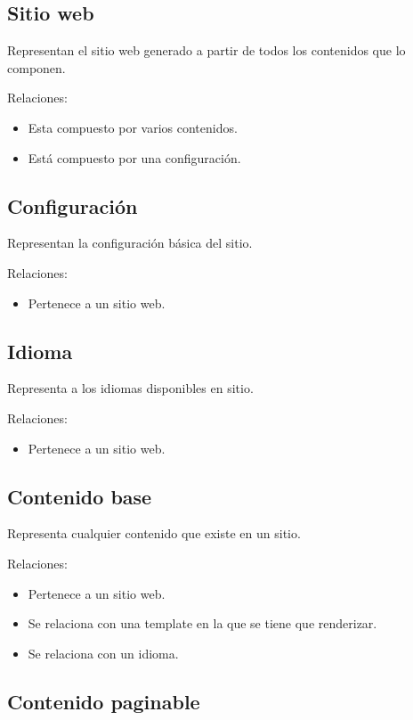 \subsection{Sitio web}

Representan el sitio web generado a partir de todos los contenidos que lo componen.

Relaciones:
\begin{itemize}
    \item Esta compuesto por varios contenidos.
    \item Está compuesto por una configuración.
\end{itemize}

\subsection{Configuración}

Representan la configuración básica del sitio.

Relaciones:
\begin{itemize}
    \item Pertenece a un sitio web.
\end{itemize}

\subsection{Idioma}

Representa a los idiomas disponibles en sitio.

Relaciones:
\begin{itemize}
    \item Pertenece a un sitio web.
\end{itemize}

\subsection{Contenido base}

Representa cualquier contenido que existe en un sitio.

Relaciones:
\begin{itemize}
    \item Pertenece a un sitio web.
    \item Se relaciona con una template en la que se tiene que renderizar.
    \item Se relaciona con un idioma.
\end{itemize}

\subsection{Contenido paginable}


